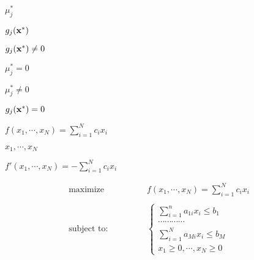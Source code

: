 \documentclass{article}
\def\lthtmlcheckvsize{\ifdim\ht\sizebox<\vsize 
  \ifdim\wd\sizebox<\hsize\expandafter\hfill\fi \expandafter\vfill
  \else\expandafter\vss\fi}%
\begin{document}
{\newpage\clearpage
{}%
$ \mu_j^*$%
\lthtmlindisplaymathZ
\lthtmlcheckvsize\clearpage}

{\newpage\clearpage
{}%
$ g_j({\bf x}^*)$%
\lthtmlindisplaymathZ
\lthtmlcheckvsize\clearpage}

{\newpage\clearpage
{}%
$ g_j({\bf x}^*)\ne 0$%
\lthtmlindisplaymathZ
\lthtmlcheckvsize\clearpage}

{\newpage\clearpage
{}%
$ \mu_j^*=0$%
\lthtmlindisplaymathZ
\lthtmlcheckvsize\clearpage}

{\newpage\clearpage
{}%
$ \mu_j^*\ne 0$%
\lthtmlindisplaymathZ
\lthtmlcheckvsize\clearpage}

{\newpage\clearpage
{}%
$ g_j({\bf x}^*)=0$%
\lthtmlindisplaymathZ
\lthtmlcheckvsize\clearpage}

{\newpage\clearpage
{}%
$ f(x_1,\cdots,x_N)=\sum_{i=1}^N c_ix_i$%
\lthtmlindisplaymathZ
\lthtmlcheckvsize\clearpage}

{\newpage\clearpage
{}%
$ x_1,\cdots,x_N$%
\lthtmlindisplaymathZ
\lthtmlcheckvsize\clearpage}

{\newpage\clearpage
{}%
$ f'(x_1,\cdots,x_N)=-\sum_{i=1}^N c_ix_i$%
\lthtmlindisplaymathZ
\lthtmlcheckvsize\clearpage}

{\newpage\clearpage
{}%
\begin{displaymath}\begin{array}{ll}
\mbox{maximize}    &
f(x_1,\cdots,x_N)=\sum_{i=1}^N c_ix_i \\
\;\;\;\;\;\;\;\;\;\;\;\;\;\;\;\;\;\;\;\;\;\;\;\;\;\;\;\;\;\;\\
\mbox{subject to:} &
\left\{ \begin{array}{l}
\sum_{i=1}^n a_{1i}x_i\le b_1\\
\cdots \cdots \cdots \cdots\\
\sum_{i=1}^N a_{Mi}x_i \le b_M\\
x_1\ge 0,\cdots,x_N\ge 0
\end{array} \right.
\end{array}\end{displaymath}%
\lthtmldisplayZ
\lthtmlcheckvsize\clearpage}
\end{document}
